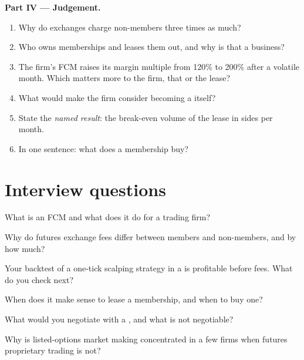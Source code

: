 \begin{problem}
\medskip\noindent\textbf{Part IV --- Judgement.}
\begin{enumerate}[resume]
\item Why do exchanges charge non-members three times as much?
\item Who owns memberships and leases them out, and why is that a business?
\item The firm's FCM raises its margin multiple from 120\% to 200\% after a
volatile month. Which matters more to the firm, that or the lease?
\item What would make the firm consider becoming a  itself?
\item State the \emph{named result}: the break-even volume of the lease in
sides per month.
\item In one sentence: what does a membership buy?
\end{enumerate}
\end{problem}

\section{Interview questions}

\begin{interviewq}\label{iq:m1:getting-access-futures-options:1}
What is an FCM and what does it do for a trading firm?
\end{interviewq}

\begin{interviewq}\label{iq:m1:getting-access-futures-options:2}
Why do futures exchange fees differ between members and non-members, and by
how much?
\end{interviewq}

\begin{interviewq}\label{iq:m1:getting-access-futures-options:3}
Your backtest of a one-tick scalping strategy in a  is
profitable before fees. What do you check next?
\end{interviewq}

\begin{interviewq}\label{iq:m1:getting-access-futures-options:4}
When does it make sense to lease a membership, and when to buy one?
\end{interviewq}

\begin{interviewq}\label{iq:m1:getting-access-futures-options:5}
What would you negotiate with a , and what is not
negotiable?
\end{interviewq}

\begin{interviewq}\label{iq:m1:getting-access-futures-options:6}
Why is listed-options market making concentrated in a few firms when
futures proprietary trading is not?
\end{interviewq}
